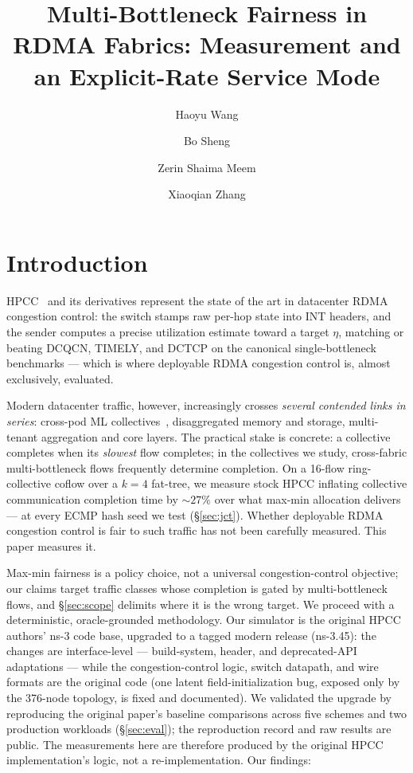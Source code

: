 \documentclass[sigconf, nonacm]{acmart}
\title[Multi-Bottleneck Fairness in RDMA Fabrics]{Multi-Bottleneck Fairness in RDMA Fabrics: Measurement and an Explicit-Rate Service Mode}
\author{Haoyu Wang}
\affiliation{%
  \institution{University of Massachusetts Boston}
  \city{Boston}
  \state{MA}
  \country{USA}}
\author{Bo Sheng}
\affiliation{%
  \institution{University of Massachusetts Boston}
  \city{Boston}
  \state{MA}
  \country{USA}}
\author{Zerin Shaima Meem}
\affiliation{%
  \institution{University of Nebraska Omaha}
  \city{Omaha}
  \state{NE}
  \country{USA}}
\author{Xiaoqian Zhang}
\affiliation{%
  \institution{University of Nebraska Omaha}
  \city{Omaha}
  \state{NE}
  \country{USA}}
\begin{document}
\maketitle

\section{Introduction}

HPCC~\cite{li2019hpcc} and its derivatives represent the state of the art in datacenter RDMA
congestion control: the switch stamps raw per-hop state into INT headers, and the sender
computes a precise utilization estimate toward a target $\eta$, matching or beating DCQCN,
TIMELY, and DCTCP on the canonical single-bottleneck benchmarks --- which is where deployable
RDMA congestion control is, almost exclusively, evaluated.

Modern datacenter traffic, however, increasingly crosses \emph{several contended links in
series}: cross-pod ML collectives~\cite{sergeev2018horovod}, disaggregated memory and
storage, multi-tenant aggregation and core layers. The practical stake is concrete: a collective completes when its
\emph{slowest} flow completes; in the collectives we study, cross-fabric multi-bottleneck
flows frequently determine completion. On a 16-flow ring-collective coflow over a $k{=}4$ fat-tree, we measure stock
HPCC inflating collective communication completion time by ${\sim}27\%$ over what max-min
allocation delivers ---
at every ECMP hash seed we test (\S\ref{sec:jct}). Whether deployable RDMA congestion control
is fair to such traffic has not been carefully measured. This paper measures it.

Max-min fairness is a policy choice, not a universal congestion-control objective; our claims
target traffic classes whose completion is gated by multi-bottleneck flows, and \S\ref{sec:scope}
delimits where it is the wrong target. We proceed with a deterministic, oracle-grounded
methodology. Our simulator is the original HPCC authors' ns-3 code base, upgraded to a
tagged modern release (ns-3.45): the changes are interface-level --- build-system, header, and
deprecated-API adaptations --- while the congestion-control logic, switch datapath, and wire
formats are the original code (one latent field-initialization bug, exposed only by the 376-node
topology, is fixed and documented). We validated the upgrade by reproducing the original paper's
baseline comparisons across five schemes and two production workloads (\S\ref{sec:eval}); the
reproduction record and raw results are public. The measurements here are therefore produced by
the original HPCC implementation's logic, not a re-implementation. Our findings:
\end{document}
